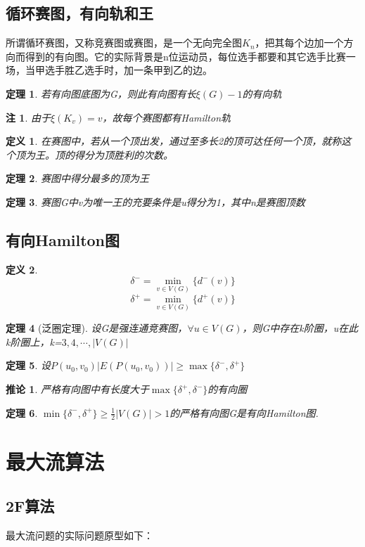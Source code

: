 \documentclass[UTF8]{ctexart}
\newtheorem{dfnt}{定义}
\newtheorem{thr}{定理}
\newtheorem*{coro}{推论}
\newtheorem*{note}{注}
\begin{document}
\subsection{循环赛图，有向轨和王}
所谓循环赛图，又称竞赛图或赛图，是一个无向完全图$K_n$，把其每个边加一个方向而得到的有向图。它的实际背景是n位运动员，每位选手都要和其它选手比赛一场，当甲选手胜乙选手时，加一条甲到乙的边。
\begin{thr}
若有向图底图为G，则此有向图有长$\xi (G)-1$的有向轨
\end{thr}
\begin{note}
由于$\xi (K_v) =v$，故每个赛图都有Hamilton轨
\end{note}
\begin{dfnt}
在赛图中，若从一个顶出发，通过至多长2的顶可达任何一个顶，就称这个顶为王。顶的得分为顶胜利的次数。
\end{dfnt}
\begin{thr}
赛图中得分最多的顶为王
\end{thr}
\begin{thr}
赛图G中v为唯一王的充要条件是u得分为1，其中n是赛图顶数
\end{thr}
\subsection{有向Hamilton图}
\begin{dfnt}
$$\delta^- = \min_{v \in V(G)}\{d^-(v)\}$$
$$\delta^+ = \min_{v \in V(G)}\{d^+(v)\}$$
\end{dfnt}
\begin{thr}[泛圈定理]
设G是强连通竞赛图，$\forall u \in V(G)$，则G中存在k阶圈，u在此k阶圈上，k=$3,4,\cdots,|V(G)|$
\end{thr}
\begin{thr}
设$P(u_0,v_0)$$|E(P(u_0,v_0))| \geq \max \{\delta^-,\delta^+\}$
\end{thr}
\begin{coro}
严格有向图中有长度大于$\max\{\delta^+,\delta^-\}$的有向圈
\end{coro}
\begin{thr}
$\min\{\delta^-,\delta^+\} \geq \frac{1}{2} |V(G)| >1$的严格有向图G是有向Hamilton图.
\end{thr}
\section{最大流算法}
\subsection{2F算法}
最大流问题的实际问题原型如下：
\end{document}

